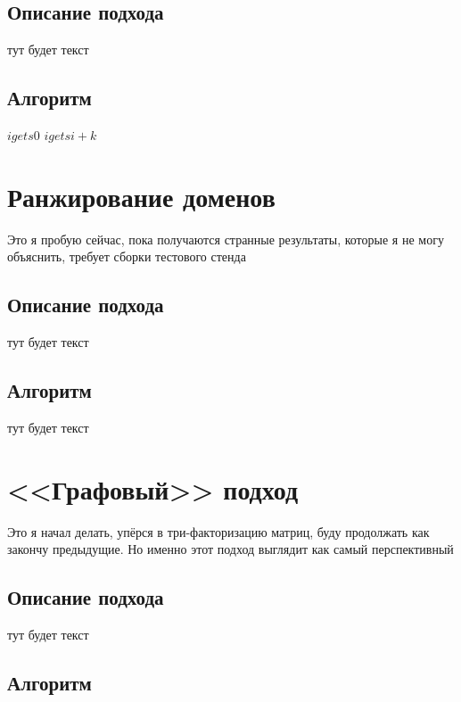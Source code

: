 \documentclass[14pt]{extreport}
\begin{document}
	\section{Описание подхода}
	тут будет текст
	\section{Алгоритм}

\begin{algorithmic}
    \State $igets 0$
\Else
        \State $igets i+k$
    \EndIf
\EndIf
\end{algorithmic}
	
	\chapter{Ранжирование доменов}
	Это я пробую сейчас, пока получаются странные результаты, которые я не могу объяснить, требует сборки тестового стенда
	\section{Описание подхода}
	тут будет текст
	\section{Алгоритм}
	тут будет текст

	\chapter{<<Графовый>> подход}
	Это я начал делать, упёрся в три-факторизацию матриц, буду продолжать как закончу предыдущие. Но именно этот подход выглядит как самый перспективный
	\section{Описание подхода}
	тут будет текст
	\section{Алгоритм}
	

	
	
\end{document}
